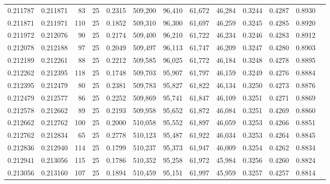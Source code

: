 \begin{tabular}{rrrrrrrrrrrrr}
0.211787 & 0.211871 &    83 &  25 &                                     0.2315 & 509,200 &  96,410 &  61,672 &  46,284 & 0.3244 & 0.4287 & 0.8930 \\
0.211871 & 0.211971 &   110 &  25 &                                     0.1852 & 509,310 &  96,300 &  61,697 &  46,259 & 0.3245 & 0.4285 & 0.8920 \\
0.211972 & 0.212076 &    90 &  25 &                                     0.2174 & 509,400 &  96,210 &  61,722 &  46,234 & 0.3246 & 0.4283 & 0.8912 \\
0.212078 & 0.212188 &    97 &  25 &                                     0.2049 & 509,497 &  96,113 &  61,747 &  46,209 & 0.3247 & 0.4280 & 0.8903 \\
0.212189 & 0.212261 &    88 &  25 &                                     0.2212 & 509,585 &  96,025 &  61,772 &  46,184 & 0.3248 & 0.4278 & 0.8895 \\
0.212262 & 0.212395 &   118 &  25 &                                     0.1748 & 509,703 &  95,907 &  61,797 &  46,159 & 0.3249 & 0.4276 & 0.8884 \\
0.212395 & 0.212479 &    80 &  25 &                                     0.2381 & 509,783 &  95,827 &  61,822 &  46,134 & 0.3250 & 0.4273 & 0.8876 \\
0.212479 & 0.212577 &    86 &  25 &                                     0.2252 & 509,869 &  95,741 &  61,847 &  46,109 & 0.3251 & 0.4271 & 0.8869 \\
0.212578 & 0.212662 &    89 &  25 &                                     0.2193 & 509,958 &  95,652 &  61,872 &  46,084 & 0.3251 & 0.4269 & 0.8860 \\
0.212662 & 0.212762 &   100 &  25 &                                     0.2000 & 510,058 &  95,552 &  61,897 &  46,059 & 0.3253 & 0.4266 & 0.8851 \\
0.212762 & 0.212834 &    65 &  25 &                                     0.2778 & 510,123 &  95,487 &  61,922 &  46,034 & 0.3253 & 0.4264 & 0.8845 \\
0.212836 & 0.212940 &   114 &  25 &                                     0.1799 & 510,237 &  95,373 &  61,947 &  46,009 & 0.3254 & 0.4262 & 0.8834 \\
0.212941 & 0.213056 &   115 &  25 &                                     0.1786 & 510,352 &  95,258 &  61,972 &  45,984 & 0.3256 & 0.4260 & 0.8824 \\
0.213056 & 0.213160 &   107 &  25 &                                     0.1894 & 510,459 &  95,151 &  61,997 &  45,959 & 0.3257 & 0.4257 & 0.8814 \\

\end{tabular}
